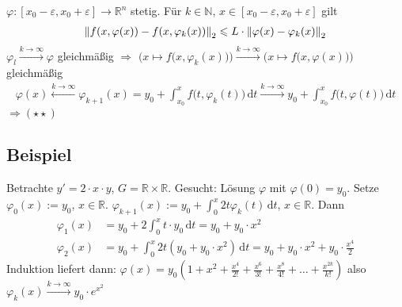 \begin{description}
\[	\]
	$\varphi : [x_0 -\varepsilon, x_0 +\varepsilon] \to \mathds{R}^n$ stetig. Für $k \in \mathds{N}$, $x \in [x_0 -\varepsilon, x_0 +\varepsilon]$ gilt 
	\begin{align*}
		\norm[2]{f(x, \varphi(x)) - f(x, \varphi_k(x))} \le L \cdot \norm[2]{\varphi (x) - \varphi_k(x)} 
	\end{align*}
	$\varphi_l \xrightarrow{k \to \infty} \varphi$ gleichmäßig
	$\Rightarrow $ $\Big(x \mapsto f\big(x, \varphi_k(x)\big)\Big) \xrightarrow{k \to \infty} \Big(x \mapsto f\big(x, \varphi(x)\big)\Big)$ 
	gleichmäßig 
	\begin{align*}
		\varphi(x) \stackrel{k \to \infty}{\longleftarrow} \varphi_{k+1}(x) = y_0 + \int_{x_0} ^{x} \! f\big( t, \varphi_k(t)\big)  \, \mathrm{d}t 
		\xrightarrow{k \to \infty} y_0 + \int_{x_0} ^{x} \! f\big(t, \varphi(t)\big)  \, \mathrm{d}t
	\end{align*}
	$\Rightarrow (\star\star)$ \bewende
\end{description}

\subsection[Beispiel: Anwendung von Picard-Lindelöf]{Beispiel} %
\label{sub:18}
Betrachte $y' = 2 \cdot x \cdot  y$, $G = \mathds{R}\times \mathds{R}$. Gesucht: Lösung $\varphi$ mit $\varphi(0)=y_0$. Setze $\varphi_0(x) := y_0$, $x \in \mathds{R}$.
$\varphi_{k+1}(x) := y_0 + \int_{0} ^{x} \! 2 t \varphi_k(t)  \, \mathrm{d}t$, $x \in \mathds{R}$. Dann
\begin{align*}
	\varphi_1(x) &= y_0 + 2 \int_{0} ^{x} \! t \cdot  y_0  \, \mathrm{d}t = y_0 + y_0 \cdot x^2 \\
	\varphi_2(x) &= y_0 + \int_{0} ^{x} \! 2 t (y_0 + y_0 \cdot x^2)  \, \mathrm{d}t = y_0 + y_0 \cdot x^2 + y_0 \cdot \frac{x^4}{2} 
\end{align*}
Induktion liefert dann: $\varphi(x) = y_0(1+ x^2 + \frac{x^4}{2!} + \frac{x^6}{3!} + \frac{x^8}{4!} + \ldots + \frac{x^{2k}}{k!}    )$ also 
$\varphi_k (x) \xrightarrow{k \to \infty} y_0 \cdot e^{x^2}$

